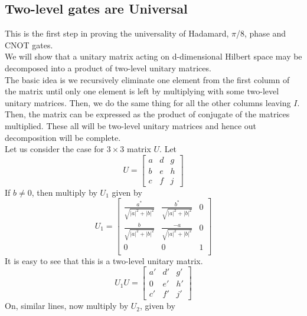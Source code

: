 \subsection{Two-level gates are Universal}
This is the first step in proving the universality of Hadamard, $\pi$/8, phase and CNOT gates. \\
We will show that a unitary matrix acting on d-dimensional Hilbert space may be decomposed into a product of two-level unitary matrices.\\
The basic idea is we recursively eliminate one element from the first column of the matrix until only one element is left by multiplying with some two-level unitary matrices. Then, we do the same thing for all the other columns leaving $I$. Then, the matrix can be expressed as the product of conjugate of the matrices multiplied. These all will be two-level unitary matrices and hence out decomposition will be complete. \\
Let us consider the case for $3 \times 3$ matrix $U$. Let
\begin{equation}
U =  \left[ {\begin{array}{ccc}
   a & d & g\\
   b & e & h\\
    c & f & j
  \end{array} } \right]
\end{equation}
If $b \not= 0$, then multiply by $U_1$ given by
\begin{equation}
U_1 =  \left[ {\begin{array}{ccc}
   \frac{a^*}{\sqrt{|a|^2 + |b|^2}}& \frac{b^*}{\sqrt{|a|^2 + |b|^2}}  & 0\\
   \frac{b}{\sqrt{|a|^2 + |b|^2}} & \frac{-a}{\sqrt{|a|^2 + |b|^2}} & 0  \\
   0 & 0 & 1 \\
  \end{array} } \right]
\end{equation}
It is easy to see that this is a two-level unitary matrix. 
\begin{equation}
U_1 U = \left[ {\begin{array}{ccc}
   a' & d' & g'\\
   0 & e' & h'\\
    c' & f' & j'
  \end{array} } \right]
\end{equation}On, similar lines, now multiply by $U_2$, given by
